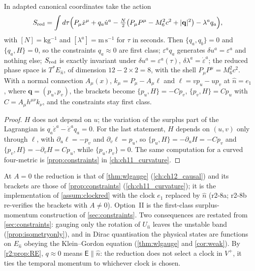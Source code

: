 \begin{proposition}
\label{r2:prop:shellII}
In adapted canonical coordinates take the action
\[
S_{\rm red}=\int d\tau\Bigl(P_\mu\dot x^\mu+q_a\dot u^a-\tfrac N2\bigl(P_\mu P^\mu-M_6^2c^2+|\mathbf q|^2\bigr)-\lambda^aq_a\Bigr),
\]
with $[N]=\mathrm{kg^{-1}}$ and $[\lambda^a]=\mathrm{m\,s^{-1}}$ for $\tau$ in seconds. Then $\{q_a,q_b\}=0$ and $\{q_a,H\}=0$, so the constraints $q_a\approx0$ are
first class; $\varepsilon^aq_a$ generates $\delta u^a=\varepsilon^a$ and nothing else; $S_{\rm red}$ is exactly invariant under $\delta u^a=\varepsilon^a(\tau)$,
$\delta\lambda^a=\dot\varepsilon^a$; the reduced phase space is $T^*E_{\hat n}$, of dimension $12-2\times2=8$, with the shell $P_\mu P^\mu=M_6^2c^2$. With a normal
connection $A_\mu(x)$, $k_\mu=P_\mu-A_\mu\ell$ and $\ell=vp_u-up_v$ at $\hat n=e_1$, where $\mathbf q=(p_u,p_v)$, the brackets become $\{p_u,H\}=-Cp_v$, $\{p_v,H\}=Cp_u$ with $C=A_\mu
h^{\mu\nu}k_\nu$, and the constraints stay first class.
\end{proposition}

\begin{proof}
$H$ does not depend on $u$; the variation of the surplus part of the Lagrangian is $q_a\dot\varepsilon^a-\dot\varepsilon^aq_a=0$. For the last
statement, $H$ depends on $(u,v)$ only through $\ell$, with $\partial_u\ell=-p_v$ and $\partial_v\ell=p_u$, so $\{p_u,H\}=-\partial_uH=-Cp_v$ and
$\{p_v,H\}=-\partial_vH=Cp_u$, while $\{p_u,p_v\}=0$. The same computation for a curved four-metric is \cref{prop:constraints} in
\cref{ch:ch11_curvature}.
\end{proof}

At $A=0$ the reduction is that of \cref{thm:wlgauge} (\cref{ch:ch12_causal}) and its brackets are those of \cref{prop:constraints} (\cref{ch:ch11_curvature}); it is the implementation of \cref{assum:clockred} with the clock $e_1$ replaced by $\hat n$ (r2-8a; r2-8b re-verifies the brackets with
$A\neq0$). Option~II is the first-class surplus-momentum construction of \cref{sec:constraints}. Two consequences are restated from \cref{sec:constraints}: gauging only the rotation of $U_{\hat n}$ leaves the unstable band
(\cref{prop:isometryonly}), and in Dirac quantisation the physical states are functions on $E_{\hat n}$ obeying the Klein--Gordon equation (\cref{thm:wlgauge} and \cref{cor:weak}). By
\cref{r2:prop:RE}, $q\approx0$ means $\boldsymbol{\mathsf E}\parallel \hat n$: the reduction does not select a clock in $V^+$, it ties the temporal momentum
to whichever clock is chosen.

